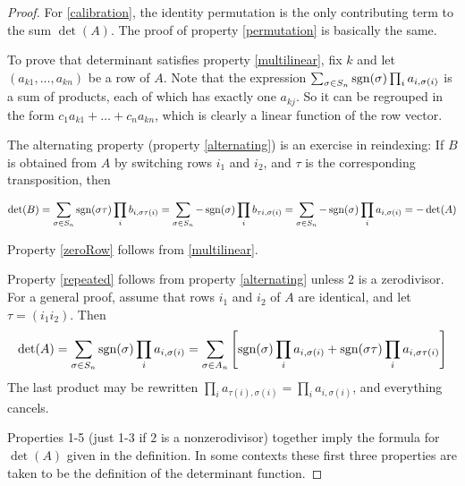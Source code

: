 \begin{proof}
	For \ref{calibration}, the identity permutation is the only contributing term to the sum $\det(A)$.  The proof of 
	property \ref{permutation} is basically the same.

	To prove that determinant satisfies property \ref{multilinear}, fix $k$ and let $(a_{k1}, \ldots, a_{kn})$
	be a row of $A$.  Note that the expression
	$\sum_{\sigma \in S_n} \operatorname{sgn}(\sigma) \prod_ i a_{i,\sigma(i)}$ is a sum of products, each of which 
	has exactly one $a_{kj}$.  So it can be regrouped in the form $c_1a_{k1} + \ldots + c_na_{kn}$, which is clearly
	a linear function of the row vector.

	The alternating property (property \ref{alternating}) is an exercise in 
	reindexing:  If $B$ is obtained from $A$ by switching rows $i_1$ and $i_2$, and $\tau$ is the corresponding 
	transposition, then 
		
	$$\det(B) 
	= \sum_{\sigma \in S_n} \operatorname{sgn}(\sigma \tau) \prod_i b_{i,\sigma\tau(i)}
	= \sum_{\sigma \in S_n} -\operatorname{sgn}(\sigma) \prod_ i b_{\tau i,\sigma(i)}
	= \sum_{\sigma \in S_n} -\operatorname{sgn}(\sigma) \prod_ i a_{i,\sigma(i)} = - \det (A)$$
	
	Property \ref{zeroRow} follows from \ref{multilinear}.
	
	Property \ref{repeated} follows from property \ref{alternating} unless $2$ is a zerodivisor.  For a general proof, assume
	that rows $i_1$ and $i_2$ of $A$ are identical, and let $\tau = (i_1i_2)$.  Then 
	$$\det(A) = \sum_{\sigma \in S_n} \operatorname{sgn}(\sigma) \prod_i a_{i,\sigma(i)} 
	= \sum_{\sigma \in A_n} \left[ \operatorname{sgn}(\sigma) \prod_i a_{i,\sigma(i)} + \operatorname{sgn}(\sigma\tau) \prod_i a_{i,\sigma\tau(i)}\right]$$
	The last product may be rewritten $\prod_i a_{\tau(i),\sigma(i)} = \prod_i a_{i,\sigma(i)}$, and everything cancels.
	
	Properties 1-5 (just 1-3 if $2$ is a nonzerodivisor) together imply the formula for $\det(A)$ given in the definition.  In 
	some contexts these first three properties are taken to be the definition of the determinant function. 
	

\end{proof}
